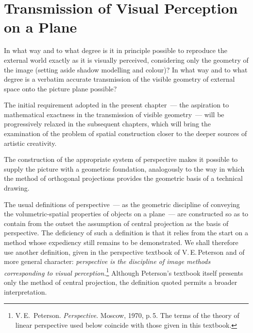 \chapter{Transmission of Visual Perception on a Plane}


In what way and to what degree is it in principle possible to reproduce the external
world exactly as it is visually perceived, considering only the geometry of the image
(setting aside shadow modelling and colour)?  In what way and to what degree is a
verbatim accurate transmission of the visible geometry of external space onto the
picture plane possible?

The initial requirement adopted in the present chapter~--- the aspiration to mathematical
exactness in the transmission of visible geometry~--- will be progressively relaxed in the
subsequent chapters, which will bring the examination of the problem of spatial
construction closer to the deeper sources of artistic creativity.

The construction of the appropriate system of perspective makes it possible to supply the
picture with a geometric foundation, analogously to the way in which the method of
orthogonal projections provides the geometric basis of a technical drawing.

The usual definitions of perspective~--- as the geometric discipline of conveying the
volumetric-spatial properties of objects on a plane~--- are constructed so as to contain
from the outset the assumption of central projection as the basis of perspective.  The
deficiency of such a definition is that it relies from the start on a method whose
expediency still remains to be demonstrated.  We shall therefore use another definition,
given in the perspective textbook of V.\,E.\,Peterson and of more general character:
\emph{perspective is the discipline of image methods corresponding to visual
perception.}\footnote{%
  V.\,E.~Peterson. \emph{Perspective}. Moscow, 1970, p.\,5.  The terms of the theory
  of linear perspective used below coincide with those given in this textbook.}
Although Peterson's textbook itself presents only the method of central projection, the
definition quoted permits a broader interpretation.

